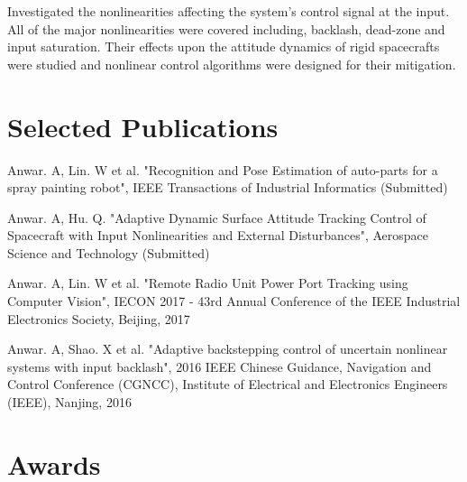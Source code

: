 \documentclass[a4paper]{deedy-resume} %
\begin{document}
\begin{minipage}[t]{0.66\textwidth}
Investigated the nonlinearities affecting the system's control signal at the input. All of the major nonlinearities were covered including, backlash, dead-zone and input saturation. Their effects upon the attitude dynamics of rigid spacecrafts were studied and nonlinear control algorithms were designed for their mitigation.

\sectionspace %


\section{Selected Publications}

\vspace{\topsep} %

\begin{tightitemize}
	\item Anwar. A, Lin. W et al. "Recognition and Pose Estimation of auto-parts for a spray painting robot", IEEE Transactions of Industrial Informatics (Submitted)
	
	\item Anwar. A, Hu. Q. "Adaptive Dynamic Surface Attitude Tracking Control of Spacecraft with Input Nonlinearities and External Disturbances", Aerospace Science and Technology (Submitted)
	
	\item Anwar. A, Lin. W et al. "Remote Radio Unit Power Port Tracking using Computer Vision", IECON 2017 - 43rd Annual Conference of the IEEE Industrial Electronics Society, Beijing, 2017
	
	\item Anwar. A, Shao. X et al. "Adaptive backstepping control of uncertain nonlinear systems with input backlash", 2016 IEEE Chinese Guidance, Navigation and Control Conference (CGNCC), Institute of Electrical and Electronics Engineers (IEEE), Nanjing, 2016
\end{tightitemize}


\section{Awards} 


\end{minipage}
\end{document}
